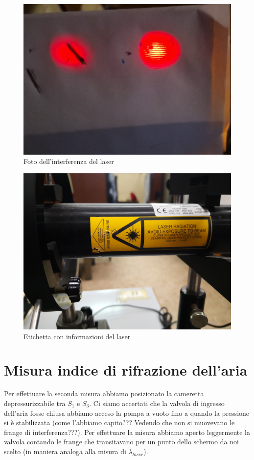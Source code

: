 \documentclass{article}
\begin{document}
\begin{figure}[h!]
  \centering
  \includegraphics[width=0.6\linewidth]{IM laser}
  \caption{Foto dell'interferenza del laser}
\end{figure}

\begin{figure}[h!]
  \centering
  \includegraphics[width=0.6\linewidth]{IM etichetta laser}
  \caption{Etichetta con informazioni del laser}
\end{figure}

\pagebreak

\section{Misura indice di rifrazione dell'aria}
Per effettuare la seconda misura abbiamo posizionato la cameretta depressurizzabile tra $S_1$ e $S_3$. Ci siamo accertati che la valvola di ingresso dell'aria fosse chiusa abbiamo acceso la pompa a vuoto fino a quando la pressione si è stabilizzata (come l'abbiamo capito??? Vedendo che non si muovevano le frange di interferenza???). Per effettuare la misura abbiamo aperto leggermente la valvola contando le frange che transitavano per un punto dello schermo da noi scelto (in maniera analoga alla misura di $\lambda_{laser}$).
\end{document}
